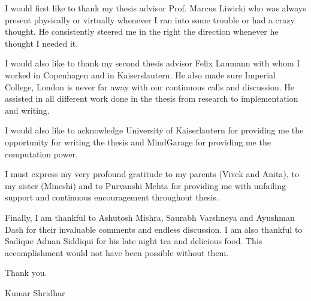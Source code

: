 
\begin{acknowledgements}      

I would first like to thank my thesis advisor Prof. Marcus Liwicki who was always present physically or virtually whenever I ran into some trouble or had a crazy thought. He consistently steered me in the right the direction whenever he thought I needed it.

I would also like to thank my second thesis advisor Felix Laumann with whom I worked in Copenhagen and in Kaiserslautern. He also made sure Imperial College, London is never far away with our continuous calls and discussion. He assisted in all different work done in the thesis from research to implementation and writing.

I would also like to acknowledge University of Kaiserlautern for providing me the opportunity for writing the thesis and MindGarage for providing me the computation power.

I must express my very profound gratitude to my parents (Vivek and Anita), to my sister (Mineshi) and to Purvanshi Mehta for providing me with unfailing support and continuous encouragement throughout thesis. 

Finally, I am thankful to Ashutosh Mishra, Saurabh Varshneya and Ayushman Dash for their invaluable comments and endless discussion. I am also thankful to Sadique Adnan Siddiqui for his late night tea and delicious food. This accomplishment would not have been possible without them. 

Thank you.

Kumar Shridhar


\end{acknowledgements}
